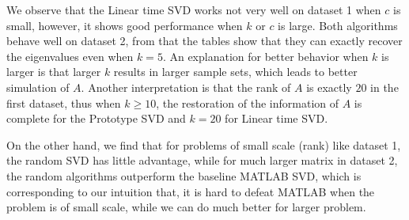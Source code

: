 \documentclass{article}
\begin{document}
We observe that the Linear time SVD works not very well on dataset 1 when $c$ is small, however, it shows good performance when $k$ or $c$ is large. Both algorithms behave well on dataset 2, from that the tables show that they can exactly recover the eigenvalues even when $k=5$. An explanation for better behavior when $k$ is larger is that larger $k$ results in larger sample sets, which leads to better simulation of $A$. Another interpretation is that the rank of $A$ is exactly $20$ in the first dataset, thus when $k\ge 10$, the restoration of the information of $A$ is complete for the Prototype SVD and $k=20$ for Linear time SVD.

On the other hand, we find that for problems of small scale (rank) like dataset 1, the random SVD has little advantage, while for much larger matrix in dataset 2, the random algorithms outperform the baseline MATLAB SVD, which is corresponding to our intuition that, it is hard to defeat MATLAB when the problem is of small scale, while we can do much better for larger problem.
  

\end{document}
